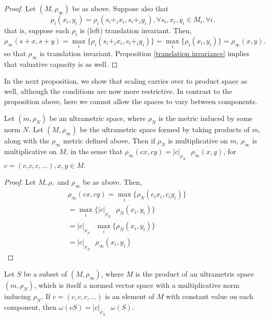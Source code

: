 \begin{proof}
Let $(M,\rho_\infty)$ be as above. Suppose also that \[\rho_i(x_i,y_i) = \rho_i(s_i +_i x_i, s_i +_iy_i), \forall s_i, x_i, y_i \in M_i, \forall i.\] that is, suppose each $\rho_i$ is (left) translation invariant. Then,  
\[
\rho_\infty(s +x, s+y)  
= \max_i\{\rho_i(s_i +_ix_i, s_i +_i y_i)\} 
= \max_i\{\rho_i(x_i, y_i)\}
= \rho_\infty(x,y).
\] so that $\rho_\infty$ is translation invariant.  Proposition \ref{translation invariance} implies that valuative capacity is as well. 
\end{proof}

In the next proposition, we show that scaling carries over to product space as well, although the conditions are now more restrictive. In contrast to the proposition above, here  we cannot allow the spaces to vary between components.\\

\begin{proposition}
Let $(m, \rho_N)$ be an ultrametric space, where $\rho_N$ is the metric induced by some norm $N$. Let $(M, \rho_{\infty})$ be the ultrametric space formed by taking products of $m$, along with the $\rho_\infty$ metric defined above.  Then if $\rho_N$ is multiplicative on $m$, $\rho_{\infty}$ is multiplicative on $M$, in the sense that $\rho_{\infty}(cx,cy) = \lvert c\rvert_{\rho_N} \text{ } \rho_\infty (x,y)$, for $c=(c,c,c,\ldots), x,y \in M$.
\end{proposition}

\begin{proof}
Let $M, \rho,$ and $\rho_{\infty}$ be as above. Then, 
\begin{align*}
\rho_\infty(cx, cy) = \max_i\{\rho_N(c_i x_i, c_i y_i)\} && \\
= \max_i\{\vert c \rvert_{\rho_N} \text{ }  \rho_N(x_i, y_i)\} && \\
= \vert c \rvert_{\rho_N} \text{ } \max_i\{\rho_N(x_i,y_i)\} && \\
= \vert c \rvert_{\rho_N} \text{ } \rho_\infty(x_i,y_i)
\end{align*}
\end{proof}

\begin{corollary}
Let $S$ be a subset of $(M, \rho_\infty)$, where $M$ is the product of an ultrametric space $(m, \rho_N)$, which is itself a normed vector space with a multiplicative norm inducing $\rho_N$. If $c=(c,c,c,\ldots)$ is an element of $M$ with constant value on each component, then $\omega(cS)=\lvert c \rvert_{\rho_N} \text{ }\omega(S)$.
\end{corollary}

